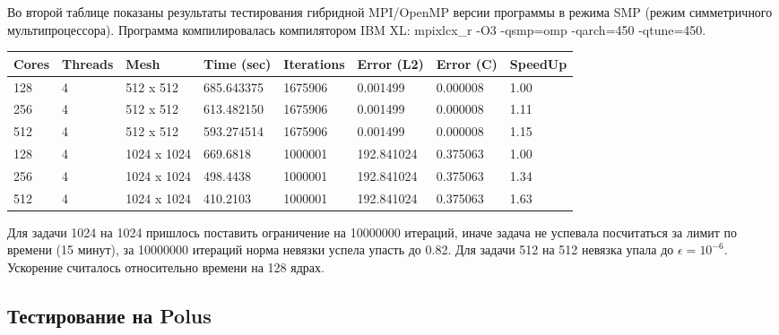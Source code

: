 \documentclass[12pt]{article}
\begin{document}
Во второй таблице показаны результаты тестирования гибридной MPI/OpenMP версии программы в режима SMP (режим симметричного мультипроцессора).
Программа компилировалась компилятором IBM XL: mpixlcx\_r -O3 -qsmp=omp -qarch=450 -qtune=450.
\begin{center}
\begin{tabular}{llllllll}
Cores & Threads & Mesh & Time (sec) & Iterations & Error (L2) & Error (C) & SpeedUp \\
\hline
128 & 4 & 512 x 512 & 685.643375 & 1675906 & 0.001499 & 0.000008 & 1.00 \\
256 & 4 & 512 x 512 & 613.482150 & 1675906 & 0.001499 & 0.000008 & 1.11 \\
512 & 4 & 512 x 512 & 593.274514 & 1675906 & 0.001499 & 0.000008 & 1.15 \\
\hline
128 & 4 & 1024 x 1024 & 669.6818 & 1000001 & 192.841024 & 0.375063 & 1.00 \\
256 & 4 & 1024 x 1024 & 498.4438 & 1000001 & 192.841024 & 0.375063 & 1.34 \\
512 & 4 & 1024 x 1024 & 410.2103 & 1000001 & 192.841024 & 0.375063 & 1.63 \\
\hline
\end{tabular}
\end{center}
Для задачи 1024 на 1024 пришлось поставить ограничение на 10000000 итераций,
иначе задача не успевала посчитаться за лимит по времени (15 минут), за 10000000 итераций
норма невязки успела упасть до 0.82. Для задачи 512 на 512 невязка упала до $\epsilon = 10^{-6}$.
Ускорение считалось относительно времени на 128 ядрах. 

\newpage

\subsection{Тестирование на Polus}
\end{document}
